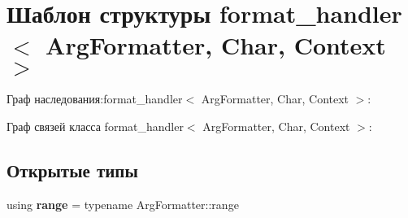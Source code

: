 \hypertarget{structformat__handler}{}\section{Шаблон структуры format\+\_\+handler$<$ Arg\+Formatter, Char, Context $>$}
\label{structformat__handler}


Граф наследования\+:format\+\_\+handler$<$ Arg\+Formatter, Char, Context $>$\+:


Граф связей класса format\+\_\+handler$<$ Arg\+Formatter, Char, Context $>$\+:
\subsection*{Открытые типы}
\begin{DoxyCompactItemize}
\item 
\mbox{\label{structformat__handler_ac2e96b22f0ce925b3492dc6fd5f32559}} 
using {\bfseries range} = typename Arg\+Formatter\+::range
\end{DoxyCompactItemize}
